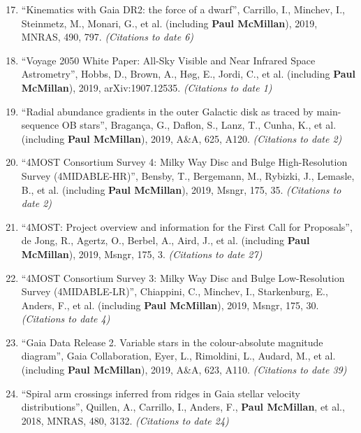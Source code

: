 \documentclass{resume}
\begin{document}
\begin{enumerate}
\setcounter{enumi}{16}
\item ``Kinematics with Gaia DR2: the force of a dwarf'', Carrillo, I., Minchev, I., Steinmetz, M., Monari, G., et al. (including \textbf{Paul McMillan}), 2019, MNRAS, 490, 797. \textit{(Citations to date 6)}

\item ``Voyage 2050 White Paper: All-Sky Visible and Near Infrared Space Astrometry'', Hobbs, D., Brown, A., H{\o}g, E., Jordi, C., et al. (including \textbf{Paul McMillan}), 2019, arXiv:1907.12535. \textit{(Citations to date 1)}

\item ``Radial abundance gradients in the outer Galactic disk as traced by main-sequence OB stars'', Bragan\c{c}a, G., Daflon, S., Lanz, T., Cunha, K., et al. (including \textbf{Paul McMillan}), 2019, A\&A, 625, A120. \textit{(Citations to date 2)}

\item ``4MOST Consortium Survey 4: Milky Way Disc and Bulge High-Resolution Survey (4MIDABLE-HR)'', Bensby, T., Bergemann, M., Rybizki, J., Lemasle, B., et al. (including \textbf{Paul McMillan}), 2019, Msngr, 175, 35. \textit{(Citations to date 2)}

\item ``4MOST: Project overview and information for the First Call for Proposals'', de Jong, R., Agertz, O., Berbel, A., Aird, J., et al. (including \textbf{Paul McMillan}), 2019, Msngr, 175, 3. \textit{(Citations to date 27)}

\item ``4MOST Consortium Survey 3: Milky Way Disc and Bulge Low-Resolution Survey (4MIDABLE-LR)'', Chiappini, C., Minchev, I., Starkenburg, E., Anders, F., et al. (including \textbf{Paul McMillan}), 2019, Msngr, 175, 30. \textit{(Citations to date 4)}

\item ``Gaia Data Release 2. Variable stars in the colour-absolute magnitude diagram'', Gaia Collaboration, Eyer, L., Rimoldini, L., Audard, M., et al. (including \textbf{Paul McMillan}), 2019, A\&A, 623, A110. \textit{(Citations to date 39)}

\item ``Spiral arm crossings inferred from ridges in Gaia stellar velocity distributions'', Quillen, A., Carrillo, I., Anders, F., \textbf{Paul McMillan}, et al., 2018, MNRAS, 480, 3132. \textit{(Citations to date 24)}


\end{enumerate}
\end{document}
